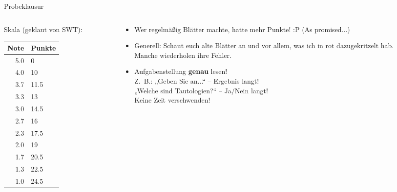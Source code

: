 



\morescalingdelimiters





	


\begin{frame}{Probeklausur}
	\begin{columns}[T] 
		\hspace{.5\baselineskip}
		\begin{column}[T]{.30\textwidth} 
			Skala {\small (geklaut von SWT)}: \\
			\begin{tabular}{|r|l|}
				\hline
				Note & Punkte \\
				\hline
				5.0	& 0 	\\ \hline
				4.0 & 10	\\ \hline
				3.7 & 11.5	\\ \hline
				3.3	& 13	\\ \hline
				3.0	& 14.5	\\ \hline
				2.7	& 16	\\ \hline
				2.3	& 17.5	\\ \hline
				2.0	& 19	\\ \hline
				1.7	& 20.5	\\ \hline
				1.3	& 22.5	\\ \hline
				1.0	& 24.5	\\ \hline
			\end{tabular}
		\end{column}
		\hspace{-\baselineskip}
		\begin{column}[T]{.68\textwidth} 
			\begin{itemize}
				\item Wer regelmäßig Blätter machte, hatte mehr Punkte! :P {\small (As promised...)}
				\item Generell: Schaut euch alte Blätter an und vor allem, \alert{was ich in rot dazugekritzelt} hab. \\
				\impl Manche wiederholen ihre Fehler.
				\item Aufgabenstellung \textbf{genau} lesen! \\
				Z.~B.: „Geben Sie an...“ – Ergebnis langt! \\ „Welche sind Tautologien?“ – Ja/Nein langt! \\ \impl Keine Zeit verschwenden! 
				

\end{itemize}
\end{column}
\end{columns}
\end{frame}
